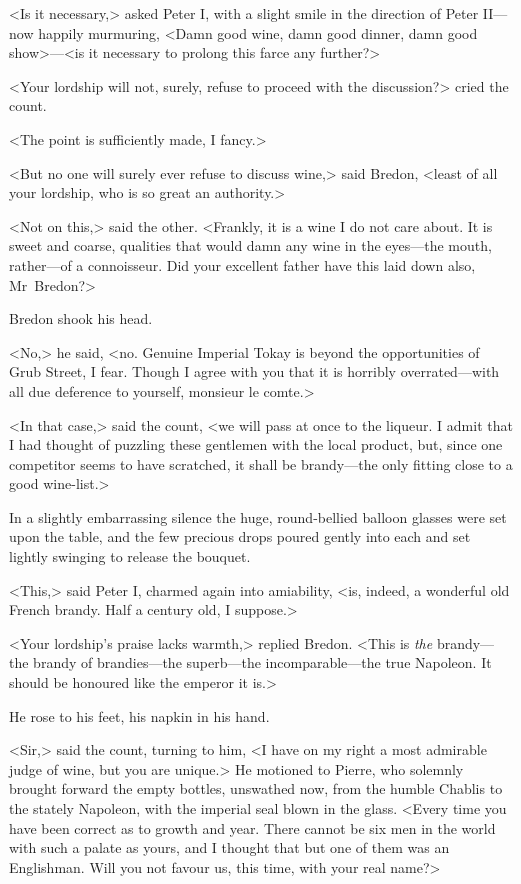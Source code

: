 <Is it necessary,> asked Peter I, with a slight smile in the direction of Peter II—now happily murmuring, <Damn good wine, damn good dinner, damn good show>—<is it necessary to prolong this farce any further?>

<Your lordship will not, surely, refuse to proceed with the discussion?> cried the count.

<The point is sufficiently made, I fancy.>

<But no one will surely ever refuse to discuss wine,> said Bredon, <least of all your lordship, who is so great an authority.>

<Not on this,> said the other. <Frankly, it is a wine I do not care about. It is sweet and coarse, qualities that would damn any wine in the eyes—the mouth, rather—of a connoisseur. Did your excellent father have this laid down also, Mr~Bredon?>

Bredon shook his head.

<No,> he said, <no. Genuine Imperial Tokay is beyond the opportunities of Grub Street, I fear. Though I agree with you that it is horribly overrated—with all due deference to yourself, monsieur le comte.>

<In that case,> said the count, <we will pass at once to the liqueur. I admit that I had thought of puzzling these gentlemen with the local product, but, since one competitor seems to have scratched, it shall be brandy—the only fitting close to a good wine-list.>

In a slightly embarrassing silence the huge, round-bellied balloon glasses were set upon the table, and the few precious drops poured gently into each and set lightly swinging to release the bouquet.

<This,> said Peter I, charmed again into amiability, <is, indeed, a wonderful old French brandy. Half a century old, I suppose.>

<Your lordship's praise lacks warmth,> replied Bredon. <This is \textit{the} brandy—the brandy of brandies—the superb—the incomparable—the true Napoleon. It should be honoured like the emperor it is.>

He rose to his feet, his napkin in his hand.

<Sir,> said the count, turning to him, <I have on my right a most admirable judge of wine, but you are unique.> He motioned to Pierre, who solemnly brought forward the empty bottles, unswathed now, from the humble Chablis to the stately Napoleon, with the imperial seal blown in the glass. <Every time you have been correct as to growth and year. There cannot be six men in the world with such a palate as yours, and I thought that but one of them was an Englishman. Will you not favour us, this time, with your real name?>


